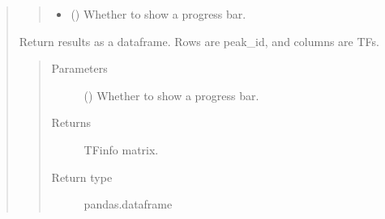 \documentclass[letterpaper,10pt,english]{sphinxmanual}
\begin{document}
\begin{quote}
\begin{fulllineitems}
\begin{fulllineitems}
\begin{quote}
\begin{description}
\begin{itemize}
\item {} 
 () \textendash{} Whether to show a progress bar.

\end{itemize}

\end{description}\end{quote}

\end{fulllineitems}


\begin{fulllineitems}
\label{\detokenize{modules/celloracle.motif_analysis:celloracle.motif_analysis.TFinfo.to_dataframe}}
Return results as a dataframe.
Rows are peak\_id, and columns are TFs.
\begin{quote}\begin{description}
\item[{Parameters}] \leavevmode
{} () \textendash{} Whether to show a progress bar.

\item[{Returns}] \leavevmode
TFinfo matrix.

\item[{Return type}] \leavevmode
pandas.dataframe

\end{description}\end{quote}

\end{fulllineitems}



\end{fulllineitems}
\end{quote}
\end{document}
